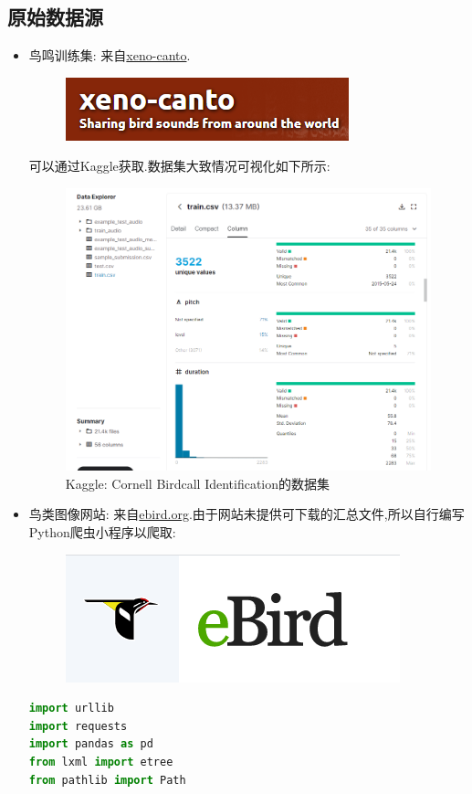 \subsection{原始数据源}
\begin{itemize}
	\item 鸟鸣训练集: 来自\href{https://www.xeno-canto.org/}{xeno-canto}.
	\begin{figure}[thbp!]
		\centering
		\includegraphics[scale=0.6]{figure/xc}
	\end{figure}
	可以通过Kaggle获取.数据集大致情况可视化如下所示:
	\begin{figure}[thbp!]
		\centering
		\includegraphics[scale=0.3]{figure/data}
		\caption{Kaggle: Cornell Birdcall Identification的数据集}
	\end{figure}
	\item 鸟类图像网站: 来自\href{https://ebird.org/home}{ebird.org}.由于网站未提供可下载的汇总文件,所以自行编写Python爬虫小程序以爬取:
	\begin{figure}[thbp!]
	\centering
	\includegraphics[scale=0.4]{figure/ebird}
	\end{figure}
	\begin{lstlisting}[language=python,breaklines=true]
import urllib
import requests
import pandas as pd
from lxml import etree
from pathlib import Path


\end{lstlisting}
\end{itemize}
